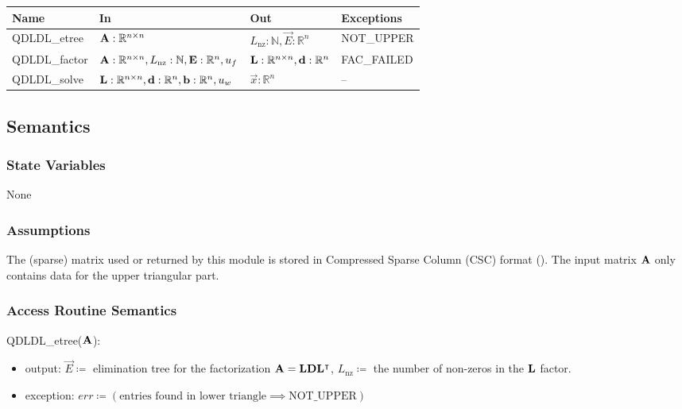 \documentclass[12pt, titlepage]{article}
\begin{document}
\begin{center}
  \begin{tabular}{p{3cm} p{5cm} p{5cm} p{2cm}}
    \hline
    \textbf{Name}       & \textbf{In}                                           & \textbf{Out}                          & \textbf{Exceptions} \\
    \hline
    QDLDL\_etree  & \(\mathbf{A}: \mathbb{R}^{n \times n}\)                         & \(L_\mathrm{nz}: \mathbb{N}, \vec{E}: \mathbb{R}^n\)          & NOT\_UPPER    \\
    QDLDL\_factor & \(\mathbf{A}: \mathbb{R}^{n \times n}, L_\mathrm{nz}: \mathbb{N}, \mathbf{E}: \mathbb{R}^n, u_f\) & \(\mathbf{L}: \mathbb{R}^{n \times n}, \mathbf{d}: \mathbb{R}^n\) & FAC\_FAILED   \\
    QDLDL\_solve  & \(\mathbf{L}: \mathbb{R}^{n \times n}, \mathbf{d}: \mathbb{R}^n, \mathbf{b}: \mathbb{R}^n, u_w\)     & \(\vec{x}: \mathbb{R}^n\)                      & --            \\
    \hline
  \end{tabular}
\end{center}

\subsection{Semantics}

\subsubsection{State Variables}

None

\subsubsection{Assumptions}

The (sparse) matrix used or returned by this module is stored in Compressed
Sparse Column (CSC) format (\cite{noauthor_compressed_nodate}). The input matrix
\(\mathbf{A}\) only contains data for the upper triangular part.

\subsubsection{Access Routine Semantics}

\noindent QDLDL\_etree(\(\mathbf{A}\)):
\begin{itemize}
\item output: \(\vec{E} \coloneq\) elimination tree for the factorization \(\mathbf{A} =
  \mathbf{L}\mathbf{D}\mathbf{L}^\intercal{}\), \(L_\mathrm{nz} \coloneq\) the number of
  non-zeros in the \(\mathbf{L}\) factor.
\item exception: \(err \coloneq (\text{entries found in lower triangle} \implies
  \text{NOT\_UPPER})\)
\end{itemize}
\end{document}
